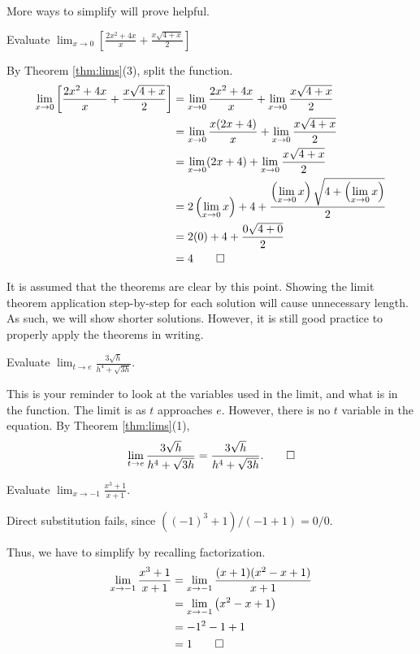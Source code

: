 More ways to simplify will prove helpful.

\begin{exmp}
	Evaluate $\displaystyle \lim_{x\to 0} \left[\frac{2x^2+4x}{x}+\frac{x\sqrt{4+x}}{2}\right]$
	\begin{soln}
		By Theorem \ref{thm:lims}(3), split the function.
		\begin{align*}
			\lim_{x\to 0} \left[\frac{2x^2+4x}{x}+\frac{x\sqrt{4+x}}{2}\right] &= \lim_{x\to 0} \frac{2x^2+4x}{x} + \lim_{x\to 0} \frac{x\sqrt{4+x}}{2} \\
			&= \lim_{x\to 0} \frac{x(2x+4)}{x} + \lim_{x\to 0} \frac{x\sqrt{4+x}}{2} \\
			&= \lim_{x\to 0} (2x+4) + \lim_{x\to 0} \frac{x\sqrt{4+x}}{2} \\
			&= 2\left(\lim_{x\to 0} x\right) + 4 + \frac{\left(\displaystyle\lim_{x\to 0} x\right)\sqrt{4+\left(\displaystyle\lim_{x\to 0} x\right)}}{2} \\
			&= 2(0) + 4 + \frac{0\sqrt{4+0}}{2} \\
			&= 4\qedhere
		\end{align*}
	\end{soln}
\end{exmp}

It is assumed that the theorems are clear by this point. Showing the limit theorem application step-by-step for each solution will cause unnecessary length. As such, we will show shorter solutions. However, it is still good practice to properly apply the theorems in writing.

\begin{exmp}
	Evaluate $\displaystyle\lim_{t\to e} \frac{3\sqrt{h}}{h^4+\sqrt{3h}}$.
	\begin{soln}
		This is your reminder to look at the variables used in the limit, and what is in the function. The limit is as $t$ approaches $e$. However, there is no $t$ variable in the equation. By Theorem \ref{thm:lims}(1),
		\[\lim_{t\to e} \frac{3\sqrt{h}}{h^4+\sqrt{3h}}=\frac{3\sqrt{h}}{h^4+\sqrt{3h}}.\qedhere\]
	\end{soln}
\end{exmp}

\begin{exmp}
	Evaluate $\displaystyle\lim_{x\to -1}\frac{x^3+1}{x+1}$.
	\begin{soln}
		Direct substitution fails, since $\left((-1)^3+1\right)/\left(-1+1\right)=0/0$.
		
		Thus, we have to simplify by recalling factorization.
		\begin{align*}
			\lim_{x\to -1}\frac{x^3+1}{x+1} &= \lim_{x\to -1}\frac{(x+1)(x^2-x+1)}{x+1} \\
			&= \lim_{x\to -1} \left(x^2-x+1 \right) \\
			&= -1^2 - 1 + 1 \\
			&= 1\qedhere
		\end{align*}
	\end{soln}
\end{exmp}


